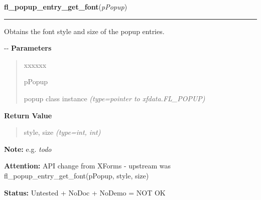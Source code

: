     \label{xformslib:flpopup:fl_popup_entry_get_font}

    \vspace{0.5ex}

\hspace{.8\funcindent}\begin{boxedminipage}{\funcwidth}

    \raggedright \textbf{fl\_popup\_entry\_get\_font}(\textit{pPopup})

    \vspace{-1.5ex}

    \rule{\textwidth}{0.5\fboxrule}
\setlength{\parskip}{2ex}

Obtains the font style and size of the popup entries.

-{}-
\setlength{\parskip}{1ex}
      \textbf{Parameters}
      \vspace{-1ex}

      \begin{quote}
        \begin{Ventry}{xxxxxx}

          \item[pPopup]


popup class instance
            {\it (type=pointer to xfdata.FL\_POPUP)}

        \end{Ventry}

      \end{quote}

      \textbf{Return Value}
    \vspace{-1ex}

      \begin{quote}

style, size
      {\it (type=int, int)}

      \end{quote}

\textbf{Note:} 
e.g. \emph{todo}


\textbf{Attention:} 
API change from XForms - upstream was
fl\_popup\_entry\_get\_font(pPopup, style, size)


\textbf{Status:} 
Untested + NoDoc + NoDemo = NOT OK


    \end{boxedminipage}

    \label{xformslib:flpopup:fl_popup_entry_set_font}

